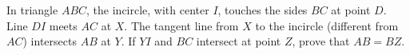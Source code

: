 In triangle $ABC$,  the incircle, with center $I$,  touches the sides $BC$ at point $D$. Line $DI$ meets $AC$ at $X$. The tangent line from $X$ to the incircle (different from $AC$) intersects $AB$ at $Y$. If $YI$ and $BC$ intersect at point $Z$,  prove that $AB=BZ$.